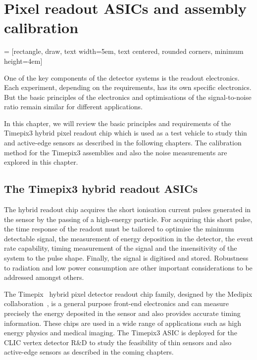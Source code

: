 \chapter{Pixel readout ASICs and assembly calibration}
\label{ch:FE_electronics}

 = [rectangle, draw, text width=5em, text centered, rounded corners, minimum
height=4em]
\usetikzlibrary{backgrounds,fit,decorations.pathreplacing} 

One of the key components of the detector systems is the readout
electronics. Each experiment, depending on the requirements, has its
own specific electronics. But the basic principles of the electronics
and optimisations of the signal-to-noise ratio remain similar for
different applications.

In this chapter, we will review the basic principles and requirements
of the Timepix3 hybrid pixel readout chip which is used as a test
vehicle to study thin and active-edge sensors as described in the
following chapters. The calibration method for the Timepix3 assemblies
and also the noise measurements are explored in this chapter.

\section{The Timepix3 hybrid readout ASICs}
\label{sec:TimepixChip}

The hybrid readout chip acquires the short ionisation current pulses
generated in the sensor by the passing of a high-energy particle. For
acquiring this short pulse, the time response of the readout must be
tailored to optimise the minimum detectable signal, the measurement of
energy deposition in the detector, the event rate capability, timing
measurement of the signal and the insensitivity of the system to the
pulse shape. Finally, the signal is digitised and stored. Robustness
to radiation and low power consumption are other important
considerations to be addressed amongst others.


The Timepix~\cite{art:tmpx,Timepix3Poikela} hybrid pixel detector
readout chip family, designed by the Medipix
collaboration~\cite{medipixCollaboration}, is a general purpose
front-end electronics and can measure precisely the energy deposited
in the sensor and also provides accurate timing information. These
chips are used in a wide range of applications such as high energy
physics and medical imaging. The Timepix3 ASIC is deployed for the
CLIC vertex detector R\&D to study the feasibility of thin sensors and
also active-edge sensors as described in the coming chapters.

